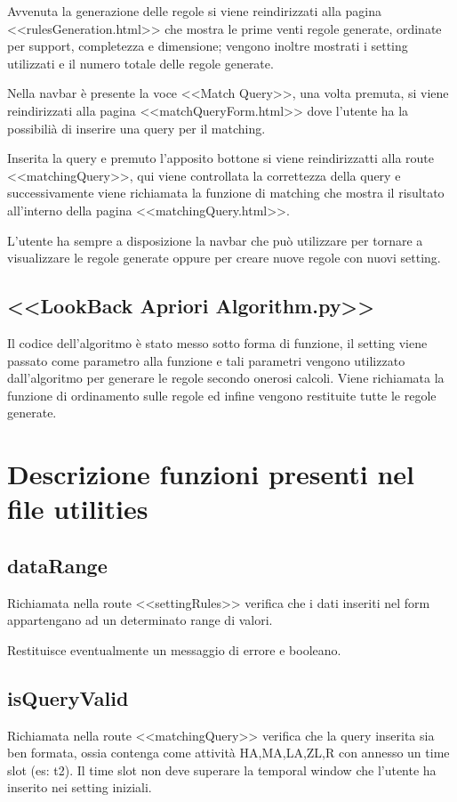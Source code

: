 \documentclass{article}
\begin{document}
Avvenuta la generazione delle regole si viene reindirizzati alla pagina <<rulesGeneration.html>> che mostra le prime venti regole generate, ordinate per support, completezza e dimensione; vengono inoltre mostrati i setting utilizzati e il numero totale delle regole generate.

Nella navbar è presente la voce <<Match Query>>, una volta premuta, si viene reindirizzati alla pagina <<matchQueryForm.html>> dove l'utente ha la possibilià di inserire una query per il matching.

Inserita la query e premuto l'apposito bottone si viene reindirizzatti alla route <<matchingQuery>>, qui viene controllata la correttezza della query e successivamente viene richiamata la funzione di matching che mostra il risultato all'interno della pagina <<matchingQuery.html>>.

L'utente ha sempre a disposizione la navbar che può utilizzare per tornare a visualizzare le regole generate oppure per creare nuove regole con nuovi setting.

\subsection{<<LookBack Apriori Algorithm.py>>}
Il codice dell'algoritmo è stato messo sotto forma di funzione, il setting viene passato come parametro alla funzione e tali parametri vengono utilizzato dall'algoritmo per generare le regole secondo onerosi calcoli.
Viene richiamata la funzione di ordinamento sulle regole ed infine vengono restituite tutte le regole generate.


\section{Descrizione funzioni presenti nel file utilities}
\subsection{dataRange}
Richiamata nella route <<settingRules>> verifica che i dati inseriti nel form appartengano ad un determinato range di valori.

Restituisce eventualmente un messaggio di errore e booleano.

\subsection{isQueryValid}
Richiamata nella route <<matchingQuery>> verifica che la query inserita sia ben formata, ossia contenga come attività HA,MA,LA,ZL,R con annesso un time slot (es: t2). Il time slot non deve superare la temporal window che l'utente ha inserito nei setting iniziali.
\end{document}
